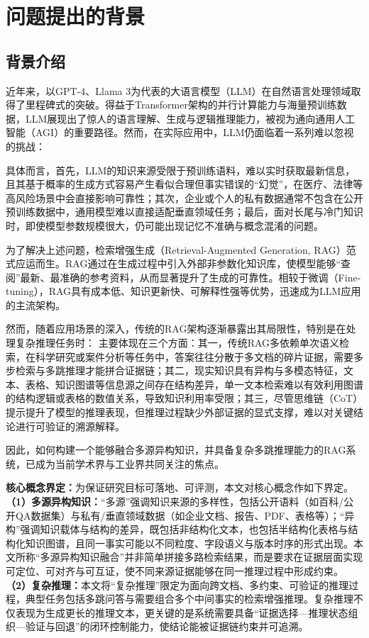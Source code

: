 \section{问题提出的背景}

\subsection{背景介绍}
近年来，以GPT-4\cite{gpt4}、Llama 3\cite{llama}为代表的大语言模型（LLM）在自然语言处理领域取得了里程碑式的突破。得益于Transformer\cite{transformer}架构的并行计算能力与海量预训练数据，LLM展现出了惊人的语言理解、生成与逻辑推理能力，被视为通向通用人工智能（AGI）的重要路径。然而，在实际应用中，LLM仍面临着一系列难以忽视的挑战：

具体而言，首先，LLM的知识来源受限于预训练语料，难以实时获取最新信息，且其基于概率的生成方式容易产生看似合理但事实错误的“幻觉”\cite{ref24}，在医疗、法律等高风险场景中会直接影响可靠性；其次，企业或个人的私有数据通常不包含在公开预训练数据中，通用模型难以直接适配垂直领域任务；最后，面对长尾与冷门知识时，即使模型参数规模很大，仍可能出现记忆不准确与概念混淆的问题。

为了解决上述问题，检索增强生成（Retrieval-Augmented Generation, RAG）范式应运而生。RAG通过在生成过程中引入外部非参数化知识库，使模型能够“查阅”最新、最准确的参考资料，从而显著提升了生成的可靠性\cite{ref1}。相较于微调（Fine-tuning），RAG具有成本低、知识更新快、可解释性强等优势，迅速成为LLM应用的主流架构。

然而，随着应用场景的深入，传统的RAG架构逐渐暴露出其局限性，特别是在处理复杂推理任务时：
主要体现在三个方面：其一，传统RAG多依赖单次语义检索，在科学研究或案件分析等任务中，答案往往分散于多文档的碎片证据，需要多步检索与多跳推理才能拼合证据链；其二，现实知识具有异构与多模态特征，文本、表格、知识图谱等信息源之间存在结构差异，单一文本检索难以有效利用图谱的结构逻辑或表格的数值关系，导致知识利用率受限；其三，尽管思维链（CoT）\cite{ref2}提示提升了模型的推理表现，但推理过程缺少外部证据的显式支撑，难以对关键结论进行可验证的溯源解释。

因此，如何构建一个能够融合多源异构知识，并具备复杂多跳推理能力的RAG系统，已成为当前学术界与工业界共同关注的焦点。

\textbf{核心概念界定：}为保证研究目标可落地、可评测，本文对核心概念作如下界定。
\textbf{（1）多源异构知识：}“多源”强调知识来源的多样性，包括公开语料（如百科/公开QA数据集）与私有/垂直领域数据（如企业文档、报告、PDF、表格等）；“异构”强调知识载体与结构的差异，既包括非结构化文本，也包括半结构化表格与结构化知识图谱，且同一事实可能以不同粒度、字段语义与版本时序的形式出现。本文所称“多源异构知识融合”并非简单拼接多路检索结果，而是要求在证据层面实现可定位、可对齐与可互证，使不同来源证据能够在同一推理过程中形成约束。
\textbf{（2）复杂推理：}本文将“复杂推理”限定为面向跨文档、多约束、可验证的推理过程，典型任务包括多跳问答与需要组合多个中间事实的检索增强推理。复杂推理不仅表现为生成更长的推理文本，更关键的是系统需要具备“证据选择—推理状态组织—验证与回退”的闭环控制能力，使结论能被证据链约束并可追溯。

